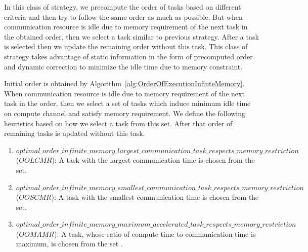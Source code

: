 \documentclass[sigconf]{acmart}
\begin{document}
	In this class of strategy, we precompute the order of tasks based on different criteria and then try to follow the same order as much as possible. But when communication resource is idle due to memory requirement of the next task in the obtained order, then we select a task similar to previous strategy. After a task is selected then we update the remaining order without this task. This class of strategy takes advantage of static information in the form of precomputed order and dynamic correction to minimize the idle time due to memory constraint.
	
	Initial order is obtained by Algorithm~\ref{alg:OrderOfExecutionInfinteMemory}. When communication resource is idle due to memory requirement of the next task in the order, then we select a set of tasks which induce minimum idle time on compute channel and satisfy memory requirement. We define the following heuristics based on how we select a task from this set. After that order of remaining tasks is updated without this task.
	
	\begin{enumerate}[label=\roman*)]
		\item $optimal \_ \allowbreak order \_ \allowbreak infinite \_ \allowbreak memory \_ \allowbreak largest \_ \allowbreak communication \_ \allowbreak task \_ \allowbreak respects \_ \allowbreak memory \_ \allowbreak restriction$ ($OOLCMR$): A task with the largest communication time is chosen from the set.
		\item $optimal \_ \allowbreak order \_ \allowbreak infinite \_ \allowbreak memory \_ \allowbreak smallest \_ \allowbreak communication \_ \allowbreak task \_ \allowbreak respects \_ \allowbreak memory \_ \allowbreak restriction$ ($OOSCMR$): A task with the smallest communication time is chosen from the set.
		\item $optimal \_ \allowbreak order \_ \allowbreak infinite \_ \allowbreak memory \_ \allowbreak maximum \_ \allowbreak accelerated \_ \allowbreak task \_ \allowbreak respects \_ \allowbreak memory \_ \allowbreak restriction$ ($OOMAMR$): A task, whose ratio of compute time to communication time is maximum, is chosen from the set .
	\end{enumerate}
	
\end{document}
